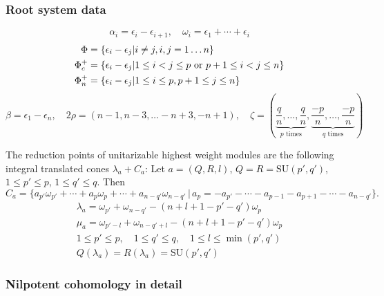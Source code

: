 \subsubsection{Root system data}

\[\alpha_i = \epsilon_i - \epsilon_{i+1}, \quad \omega_i = \epsilon_1 + \cdots + \epsilon_i \]
\begin{align*}
 \Phi & = \{ \epsilon_i - \epsilon_j | i\neq j, i,j=1\ldots n\}\\
 \Phi_c^+ & = \{ \epsilon_i-\epsilon_j | 1\leq i < j \leq p \text{ or } p+1 \leq i < j \leq n\}\\
 \Phi_n^+ & = \{ \epsilon_i - \epsilon_j | 1 \leq i \leq p, p+1 \leq j \leq n \}
\end{align*}
\[\beta = \epsilon_1 - \epsilon_n,\quad 2\rho = (n-1,n-3,\ldots -n+3,-n+1),\quad \zeta = (\underbrace{\frac{q}{n},\ldots,\frac{q}{n}}_{p\text{ times}},\underbrace{\frac{-p}{n},\ldots,\frac{-p}{n}}_{q\text{ times}})\]

The reduction points of unitarizable highest weight modules are the following integral translated cones $\lambda_a + C_a$:
Let $a=(Q,R,l)$, $Q=R=\mathrm{SU}(p',q')$, $1\leq p' \leq p$, $1\leq q'\leq q$. Then
\[
 C_a = \{a_{p'}\omega_{p'} + \cdots + a_p\omega_p + \cdots + a_{n-q'}\omega_{n-q'} \,|\, a_p=-a_{p'}-\cdots -a_{p-1}-a_{p+1} - \cdots - a_{n-q'} \}.
\]
\begin{gather*}
  \lambda_a=\omega_{p'} + \omega_{n-q'} - (n+l+1-p'-q')\omega_p   \\
  \mu_a = \omega_{p'-l}+\omega_{n-q'+l}-(n+l+1-p'-q')\omega_p\\
  1\leq p' \leq p,\quad 1\leq q' \leq q,\quad 1\leq l \leq \min(p',q')\\
  Q(\lambda_a)=R(\lambda_a)=\mathrm{SU}(p',q')
\end{gather*}

\subsubsection{Nilpotent cohomology in detail}

